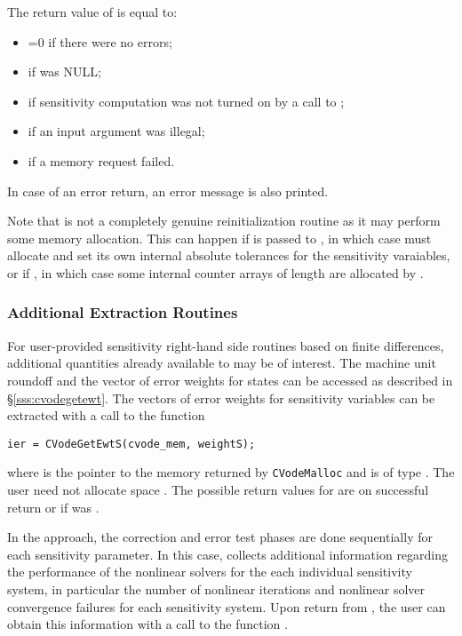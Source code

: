 The return value  of  is equal to: 
\begin{itemize}
\item {}=0 if there were no errors; 
\item {} if  was NULL;
\item {} if sensitivity computation was not turned on
      by a call to ;
\item {} if an input argument was illegal;
\item {} if a memory request failed.
\end{itemize}
In case of an error return, an error message is also printed.  

Note that  is not a completely genuine reinitialization
routine as it may perform some memory allocation. This can happen
if  is passed to , in which case {\cvodes}
must allocate and set its own internal absolute tolerances for the sensitivity
varaiables, or if , in which case some internal counter
arrays of length  are allocated by .

\subsubsection{Additional Extraction Routines}\label{sss:more_extraction}

For user-provided sensitivity right-hand side routines based on finite
differences, additional quantities already available to {\cvodes} may
be of interest. The machine unit roundoff and the vector of error weights
for states can be accessed as described in \S\ref{sss:cvodegetewt}.
The vectors of error weights for sensitivity variables can be extracted
with a call to the function
\begin{verbatim}
ier = CVodeGetEwtS(cvode_mem, weightS);
\end{verbatim}
where  is the pointer to the {\cvodes} memory returned by 
{\tt CVodeMalloc} and  is of type . 
The user need not allocate space . The possible return
values for  are  on successful return or 
if  was .

In the  approach, the correction and error test phases are done sequentially
for each sensitivity parameter. In this case, {\cvodes} collects additional information 
regarding the performance of the nonlinear solvers for the each individual sensitivity 
system, in particular the number of nonlinear iterations and nonlinear 
solver convergence failures for each sensitivity system.
Upon return from , the user can obtain this information 
with a call to the function . 

